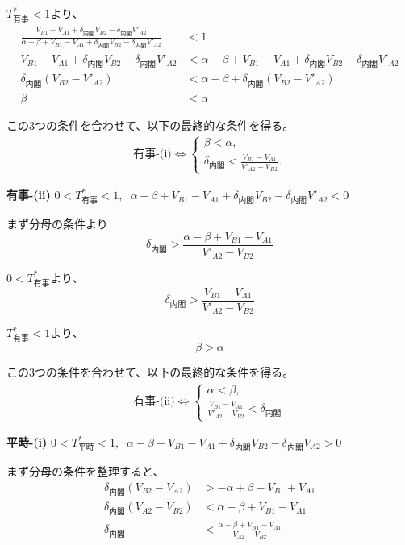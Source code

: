 \documentclass[main.tex]{subfiles}
\begin{document}
$T^*_{有事}<1$より、
\begin{align*}
    \frac{ V_{B1} - V_{A1} +\delta_{内閣}V_{B2} - \delta_{内閣}V'_{A2} }{ \alpha-\beta + V_{B1}-V_{A1} + \delta_{内閣}V_{B2} - \delta_{内閣}V'_{A2} } &< 1\\
    V_{B1} - V_{A1} +\delta_{内閣}V_{B2} - \delta_{内閣}V'_{A2} &< \alpha-\beta + V_{B1}-V_{A1} + \delta_{内閣}V_{B2} - \delta_{内閣}V'_{A2}\\
    \delta_{内閣}(V_{B2} - V'_{A2}) &< \alpha-\beta + \delta_{内閣}(V_{B2} - V'_{A2})\\
    \beta &< \alpha
\end{align*}

この3つの条件を合わせて、以下の最終的な条件を得る。
\begin{align*}
    \text{有事-(i)} \Leftrightarrow 
    \begin{cases}
        \beta < \alpha, \\
        \delta_{内閣} < \frac{V_{B1}-V_{A1}}{V'_{A2} - V_{B2}}.
    \end{cases}
\end{align*}



\bigskip
\noindent
\textbf{有事-(ii)}\; $0<T^*_{有事}<1,\;\; \alpha-\beta + V_{B1}-V_{A1} + \delta_{内閣}V_{B2} - \delta_{内閣}V'_{A2} < 0$

まず分母の条件より
$$\delta_{内閣} > \frac{\alpha-\beta + V_{B1}-V_{A1}}{V'_{A2} - V_{B2}}$$

$0<T^*_{有事}$より、
$$\delta_{内閣} > \frac{V_{B1} - V_{A1}}{V'_{A2} - V_{B2}}$$

$T^*_{有事}<1$より、
$$\beta > \alpha$$

この3つの条件を合わせて、以下の最終的な条件を得る。
\begin{align*}
    \text{有事-(ii)} \Leftrightarrow 
    \begin{cases}
        \alpha < \beta, \\
        \frac{V_{B1}-V_{A1}}{V'_{A2} - V_{B2}} < \delta_{内閣}
    \end{cases}
\end{align*}


\bigskip
\noindent
\textbf{平時-(i)}\; $0<T^*_{平時}<1,\;\; \alpha-\beta + V_{B1}-V_{A1} + \delta_{内閣}V_{B2} - \delta_{内閣}V_{A2}　> 0$

まず分母の条件を整理すると、
\begin{align*}
    \delta_{内閣}(V_{B2} - V_{A2}) &> -\alpha+\beta - V_{B1}+V_{A1} \\
    \delta_{内閣}(V_{A2} - V_{B2}) &< \alpha-\beta + V_{B1}-V_{A1}\\
    \delta_{内閣} &< \frac{\alpha-\beta + V_{B1}-V_{A1}}{V_{A2} - V_{B2}}
\end{align*}
\end{document}
